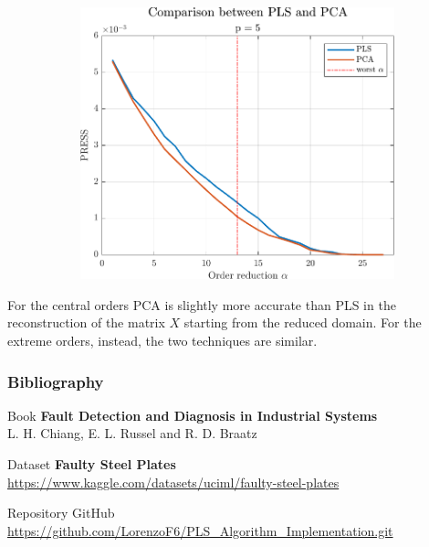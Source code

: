 \begin{frame}
	\begin{figure}
		\centering
		\begin{subfigure}[b]{0.60\textwidth}
			\includegraphics[width=\textwidth]{Images/PLS_vs_PCA.pdf}
		\end{subfigure}
	\end{figure}
	For the central orders PCA is slightly more accurate than PLS in the reconstruction of the matrix $X$ starting from the reduced domain. For the extreme orders, instead, the two techniques are similar.
\end{frame}

\begin{frame}
	\frametitle{Bibliography}
	\begin{block}{Book}
		\textbf{Fault Detection and Diagnosis in Industrial Systems}\\
		L. H. Chiang, E. L. Russel and R. D. Braatz
	\end{block}
		\begin{alertblock}{Dataset}
		\textbf{Faulty Steel Plates}\\
		\small{\url{https://www.kaggle.com/datasets/uciml/faulty-steel-plates}}
	\end{alertblock}
	\begin{exampleblock}{Repository GitHub}
		\small{\url{https://github.com/LorenzoF6/PLS_Algorithm_Implementation.git}}
	\end{exampleblock}
\end{frame}